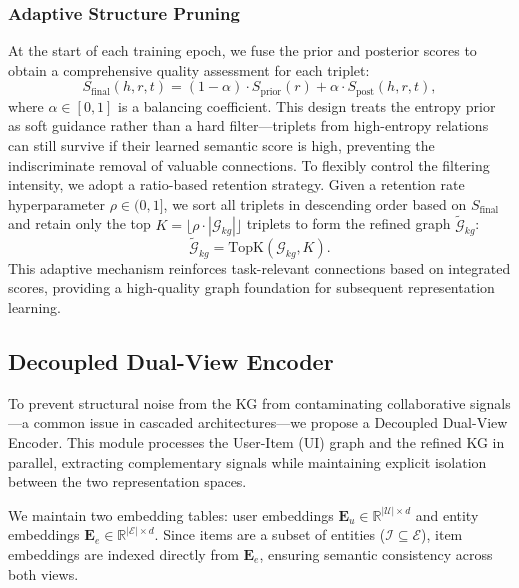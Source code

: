 \subsubsection{\textbf{Adaptive Structure Pruning}}
At the start of each training epoch, we fuse the prior and posterior scores to obtain a comprehensive quality assessment for each triplet:
\begin{equation}
	S_{\text{final}}(h, r, t) = (1 - \alpha) \cdot S_{\text{prior}}(r) + \alpha \cdot S_{\text{post}}(h, r, t),
\end{equation}
where $\alpha \in [0,1]$ is a balancing coefficient. This design treats the entropy prior as soft guidance rather than a hard filter---triplets from high-entropy relations can still survive if their learned semantic score is high, preventing the indiscriminate removal of valuable connections. To flexibly control the filtering intensity, we adopt a ratio-based retention strategy. Given a retention rate hyperparameter $\rho \in (0, 1]$, we sort all triplets in descending order based on $S_{\text{final}}$ and retain only the top $K = \lfloor \rho \cdot |\mathcal{G}_{kg}| \rfloor$ triplets to form the refined graph $\tilde{\mathcal{G}}_{kg}$:
\begin{equation}
\tilde{\mathcal{G}}_{kg} = \text{TopK}(\mathcal{G}_{kg}, K).
\end{equation}
This adaptive mechanism reinforces task-relevant connections based on integrated scores, providing a high-quality graph foundation for subsequent representation learning.

\subsection{Decoupled Dual-View Encoder}
To prevent structural noise from the KG from contaminating collaborative signals—a common issue in cascaded architectures—we propose a Decoupled Dual-View Encoder. This module processes the User-Item (UI) graph and the refined KG in parallel, extracting complementary signals while maintaining explicit isolation between the two representation spaces.

We maintain two embedding tables: user embeddings $\mathbf{E}_u \in \mathbb{R}^{|\mathcal{U}| \times d}$ and  entity embeddings $\mathbf{E}_e \in \mathbb{R}^{|\mathcal{E}| \times d}$. Since items are a subset of entities ($\mathcal{I} \subseteq \mathcal{E}$), item embeddings are  indexed directly from $\mathbf{E}_e$, ensuring semantic consistency across both views.

